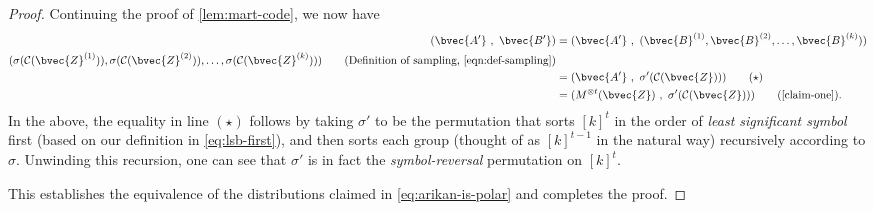 \documentclass[11pt]{article}
\begin{document}
\begin{proof}
	Continuing the proof of \cref{lem:mart-code},
	we now have
	\begin{align*}
		(\bvec{A'} ~,~ \bvec{B'})
		&= (\bvec{A'} ~,~
		(
		\bvec{B}^{(1)},
		\bvec{B}^{(2)},
		\dots,
		\bvec{B}^{(k)})) \\ 
		(
		\sigma(\mathcal{C}(\bvec{Z}^{(1)})),
		\sigma(\mathcal{C}(\bvec{Z}^{(2)})),
		\dots,
		\sigma(\mathcal{C}(\bvec{Z}^{(k)}))
		)
		\tag{Definition of sampling, \cref{eqn:def-sampling}}\\
		&= (\bvec{A'} ~,~ \sigma'(\mathcal{C}(\bvec{Z}))) \tag{$\star$}\\
		&= (M^{\otimes t}(\bvec{Z}) ~,~ \sigma'(\mathcal{C}(\bvec{Z}))) \tag{\cref{claim-one}}.
	\end{align*}
	In the above, the equality in line $(\star)$ follows by taking $\sigma'$ to be the permutation that sorts $[k]^t$ in the order of \emph{least significant symbol} first (based on our definition in \eqref{eq:lsb-first}), and then sorts each group (thought of as $[k]^{t-1}$ in the natural way) recursively according to $\sigma$. Unwinding this recursion, one can see that $\sigma'$ is in fact the \emph{symbol-reversal} permutation on $[k]^t$. 
	
	This establishes the equivalence of the distributions claimed in \eqref{eq:arikan-is-polar} and completes the proof.
\end{proof}
\end{document}
